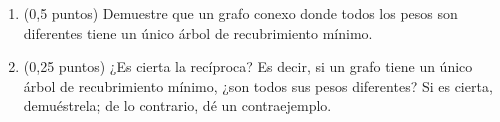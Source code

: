 
\begin{enumerate}[label=(\alph*)]
  \item (0,5 puntos) Demuestre que un grafo conexo donde todos los pesos son diferentes tiene un único árbol de recubrimiento mínimo.

  \respuesta[height=14cm]

  \item (0,25 puntos) ¿Es cierta la recíproca? Es decir, si un grafo tiene un único árbol de recubrimiento mínimo, ¿son todos sus pesos diferentes? Si es cierta, demuéstrela; de lo contrario, dé un contraejemplo.

\end{enumerate}

